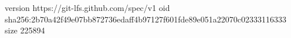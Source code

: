 version https://git-lfs.github.com/spec/v1
oid sha256:2b70a42f49e07bb872736edaff4b97127f601fde89e051a22070c02333116333
size 225894
